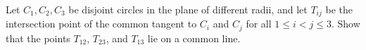\begin{problem}
    Let \( C_{1}, C_{2}, C_{3} \) be disjoint circles in the plane of different radii, and let \( T_{ij} \) be the intersection point of the common tangent to \( C_{i} \) and \( C_{j} \) for all \( 1 \le i < j \le 3 \). Show that the points \( T_{12} \), \( T_{23} \), and \( T_{13} \) lie on a common line.
\end{problem}
